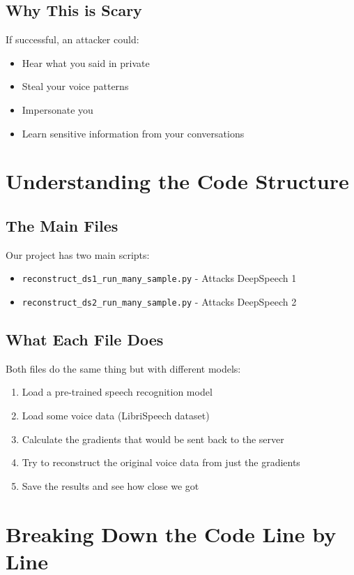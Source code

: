 \documentclass[12pt]{article}
\begin{document}
\subsection{Why This is Scary}

If successful, an attacker could:
\begin{itemize}
    \item Hear what you said in private
    \item Steal your voice patterns
    \item Impersonate you
    \item Learn sensitive information from your conversations
\end{itemize}

\section{Understanding the Code Structure}

\subsection{The Main Files}

Our project has two main scripts:
\begin{itemize}
    \item \texttt{reconstruct\_ds1\_run\_many\_sample.py} - Attacks DeepSpeech 1
    \item \texttt{reconstruct\_ds2\_run\_many\_sample.py} - Attacks DeepSpeech 2
\end{itemize}

\subsection{What Each File Does}

Both files do the same thing but with different models:
\begin{enumerate}
    \item Load a pre-trained speech recognition model
    \item Load some voice data (LibriSpeech dataset)
    \item Calculate the gradients that would be sent back to the server
    \item Try to reconstruct the original voice data from just the gradients
    \item Save the results and see how close we got
\end{enumerate}

\section{Breaking Down the Code Line by Line}
\end{document}
